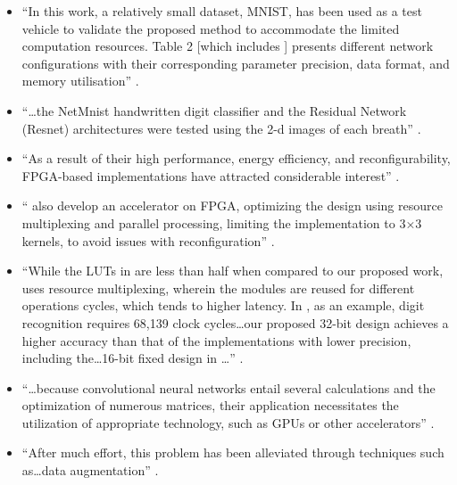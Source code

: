\begin{itemize}
	\item ``In this work, a relatively small dataset, MNIST, has been used as a
	test vehicle to validate the proposed method to accommodate the limited
	computation resources. Table 2 [which includes \citeauthor{main}] presents
	different network configurations with their corresponding parameter
	precision, data format, and memory utilisation''
	\autocite[9]{phipps2023pre}.
	\item ``{\ldots}the NetMnist handwritten digit classifier and the Residual
	Network (Resnet) architectures were tested using the 2-d images of each
	breath''
	\autocite[2]{baedorf2023reverse}.
	\item ``As a result of their high performance, energy efficiency, and
	reconfigurability, FPGA-based implementations have attracted considerable
	interest''
	\autocite[2]{aydin2023fpga}.
	\item ``\citeauthor{main} also develop an accelerator on FPGA, optimizing
	the design using resource multiplexing and parallel processing, limiting the
	implementation to 3×3 kernels, to avoid issues with reconfiguration''
	\autocite[5]{pistellato2023quantization}.
	\item ``While the LUTs in \citeauthor{main} are less than half when compared
	to our proposed work, \citeauthor{main} uses resource multiplexing, wherein
	the modules are reused for different operations cycles, which tends to
	higher latency. In \citeauthor{main}, as an example, digit recognition
	requires 68,139 clock cycles{\ldots}our proposed 32-bit design achieves a
	higher accuracy than that of the implementations with lower precision,
	including the{\ldots}16-bit fixed design in \citeauthor{main}\ldots''
	\autocite[16]{madineni2023parameterizable}.
	\item ``{\ldots}because convolutional neural networks entail several
	calculations and the optimization of numerous matrices, their application
	necessitates the utilization of appropriate technology, such as GPUs or
	other accelerators''
	\autocite[241]{naufal2023comparative}.
	\item ``After much effort, this problem has been alleviated through
	techniques such as{\ldots}data augmentation''
	\autocite[2]{yan2023end}.
\end{itemize}
